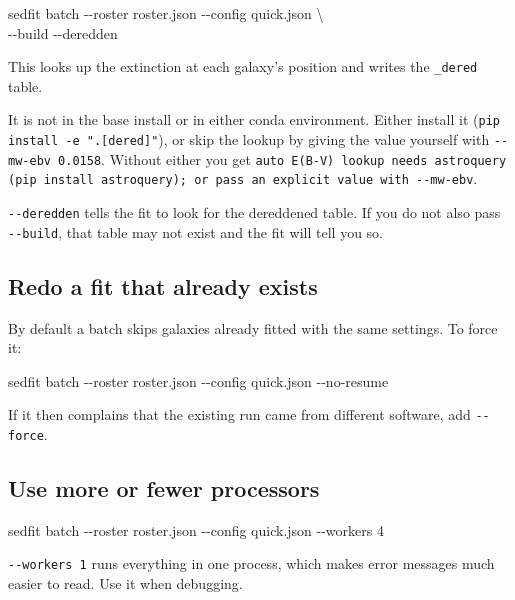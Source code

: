 \documentclass[11pt]{article}
\begin{document}
\begin{cmd}\ttfamily
sedfit batch -{}-roster roster.json -{}-config quick.json \textbackslash\\
\hspace*{4em}-{}-build -{}-deredden
\end{cmd}

This looks up the extinction at each galaxy's position and writes the
\texttt{\_dered} table.

\begin{warnbox}
It is not in the base install or in either conda environment. Either
install it (\texttt{pip install -e ".[dered]"}), or skip the lookup by
giving the value yourself with \texttt{-{}-mw-ebv 0.0158}. Without
either you get \texttt{auto E(B-V) lookup needs astroquery (pip install
astroquery); or pass an explicit value with -{}-mw-ebv}.
\end{warnbox}

\begin{warnbox}
\texttt{-{}-deredden} tells the fit to look for the dereddened table. If
you do not also pass \texttt{-{}-build}, that table may not exist and the
fit will tell you so.
\end{warnbox}

\subsection{Redo a fit that already exists}

By default a batch skips galaxies already fitted with the same settings.
To force it:

\begin{cmd}\ttfamily
sedfit batch -{}-roster roster.json -{}-config quick.json -{}-no-resume
\end{cmd}

If it then complains that the existing run came from different software,
add \texttt{-{}-force}.

\subsection{Use more or fewer processors}

\begin{cmd}\ttfamily
sedfit batch -{}-roster roster.json -{}-config quick.json -{}-workers 4
\end{cmd}

\texttt{-{}-workers 1} runs everything in one process, which makes error
messages much easier to read. Use it when debugging.
\end{document}
